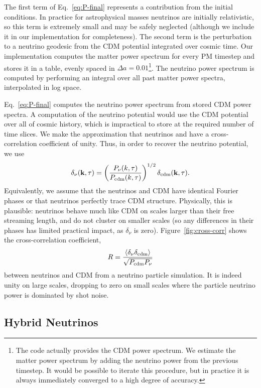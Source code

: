 \documentclass[useAMS, usenatbib]{mnras}
\newcommand{\bs}{\mathbf}
\begin{document}
The first term of Eq.~\ref{eq:P-final} represents a contribution from the initial conditions. In practice
for astrophysical masses neutrinos are initially relativistic, so this term is extremely small and may
be safely neglected (although we include it in our implementation for completeness).
The second term is the perturbation to a neutrino geodesic from the CDM potential
integrated over cosmic time. Our implementation computes the matter power spectrum for every PM timestep
and stores it in a table, evenly spaced in $\Delta a = 0.01$\footnote{The code actually provides the CDM power spectrum.
We estimate the matter power spectrum by adding the neutrino power from the previous timestep. It would be possible
to iterate this procedure, but in practice it is always immediately converged to a high degree of accuracy.}.
The neutrino power spectrum is computed by performing an integral over all past matter power spectra, interpolated in log space.

Eq.~\ref{eq:P-final} computes the neutrino power spectrum from stored CDM power spectra.
A computation of the neutrino potential would use the CDM potential over all of cosmic history, which is impractical
to store at the required number of time slices. We make the approximation that neutrinos and
have a cross-correlation coefficient of unity. Thus, in order to recover the neutrino potential, we use
\begin{equation}
\delta_{\nu}(\bs k, \tau) = \left(\frac{P_{\nu}(k,
    \tau)}{P_{\rm cdm}(k, \tau)}\right)^{1/2} \delta_{\rm cdm}(\bs k, \tau).\label{eq:phases}
\end{equation}
Equivalently, we assume that the neutrinos and CDM have identical Fourier phases or that neutrinos perfectly trace CDM structure.
Physically, this is plausible: neutrinos behave much like CDM on scales larger than their free streaming length,
and do not cluster on smaller scales (so any differences in their phases has limited practical impact, as $\delta_\nu$ is zero).
Figure~\ref{fig:cross-corr} shows the cross-correlation coefficient,
\begin{equation}
R = \frac{\left\langle \delta_\nu \delta_\mathrm{cdm} \right\rangle}{\sqrt{P_{\rm{cdm}} P_{\rm{\nu}}}}
\end{equation}
between neutrinos and CDM from a neutrino particle simulation. It is indeed unity on large scales,
dropping to zero on small scales where the particle neutrino power is dominated by shot noise.

\subsection{Hybrid Neutrinos}
\label{sec:hybrid}
\end{document}
